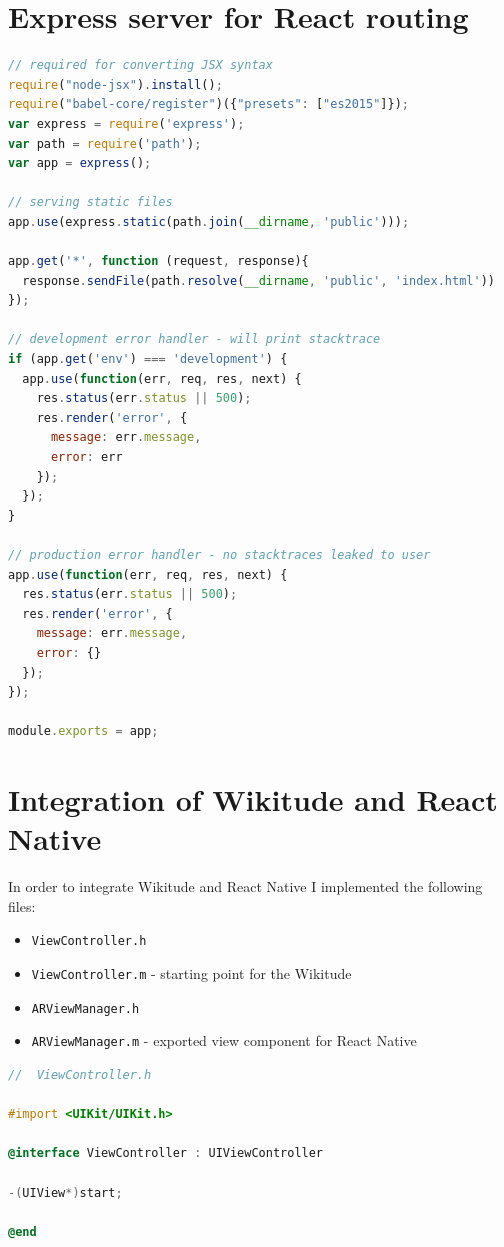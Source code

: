 \documentclass[thesis=M,english]{FITthesis}[2012/10/20]
\begin{document}
\chapter{Express server for React routing}
\label{apx:react-server}

\begin{lstlisting}[language=JavaScript]
// required for converting JSX syntax
require("node-jsx").install();
require("babel-core/register")({"presets": ["es2015"]});
var express = require('express');
var path = require('path');
var app = express();

// serving static files
app.use(express.static(path.join(__dirname, 'public')));

app.get('*', function (request, response){
  response.sendFile(path.resolve(__dirname, 'public', 'index.html'))
});

// development error handler - will print stacktrace
if (app.get('env') === 'development') {
  app.use(function(err, req, res, next) {
    res.status(err.status || 500);
    res.render('error', {
      message: err.message,
      error: err
    });
  });
}

// production error handler - no stacktraces leaked to user
app.use(function(err, req, res, next) {
  res.status(err.status || 500);
  res.render('error', {
    message: err.message,
    error: {}
  });
});

module.exports = app;
\end{lstlisting}

\chapter{Integration of Wikitude and React Native}
\label{apendix:integration}
In order to integrate Wikitude and React Native I implemented the following files:
\begin{itemize}
\item \verb|ViewController.h| 
\item \verb|ViewController.m| - starting point for the Wikitude
\item \verb|ARViewManager.h|
\item \verb|ARViewManager.m| - exported view component for React Native
\end{itemize}

\begin{lstlisting}[language=C]
//  ViewController.h

#import <UIKit/UIKit.h>

@interface ViewController : UIViewController

-(UIView*)start;

@end

\end{lstlisting}
\end{document}

